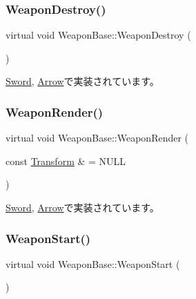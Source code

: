\subsubsection{\texorpdfstring{Weapon\+Destroy()}{WeaponDestroy()}}
{\footnotesize\ttfamily virtual void Weapon\+Base\+::\+Weapon\+Destroy (\begin{DoxyParamCaption}{ }\end{DoxyParamCaption})\hspace{0.3cm}{\ttfamily [pure virtual]}}



\mbox{\hyperlink{class_sword_a3f60d8b24b7847d6a84f0941820b711d}{Sword}}, \mbox{\hyperlink{class_arrow_a6b9bfb7bf580c147e61d111b3cb2b293}{Arrow}}で実装されています。

\mbox{\label{class_weapon_base_a619809ea6c169446d9524f8089057436}} 
\subsubsection{\texorpdfstring{Weapon\+Render()}{WeaponRender()}}
{\footnotesize\ttfamily virtual void Weapon\+Base\+::\+Weapon\+Render (\begin{DoxyParamCaption}\item[{const \mbox{\hyperlink{class_transform}{Transform}} \&}]{ = {\ttfamily NULL} }\end{DoxyParamCaption})\hspace{0.3cm}{\ttfamily [pure virtual]}}



\mbox{\hyperlink{class_sword_aba05706b8b2480a8317595f92a7bc5ce}{Sword}}, \mbox{\hyperlink{class_arrow_a30553702b80c0559705a17d92389a1fc}{Arrow}}で実装されています。

\mbox{\label{class_weapon_base_a25cd4c351638b76377e93341a9545712}} 
\subsubsection{\texorpdfstring{Weapon\+Start()}{WeaponStart()}}
{\footnotesize\ttfamily virtual void Weapon\+Base\+::\+Weapon\+Start (\begin{DoxyParamCaption}{ }\end{DoxyParamCaption})\hspace{0.3cm}{\ttfamily [pure virtual]}}



